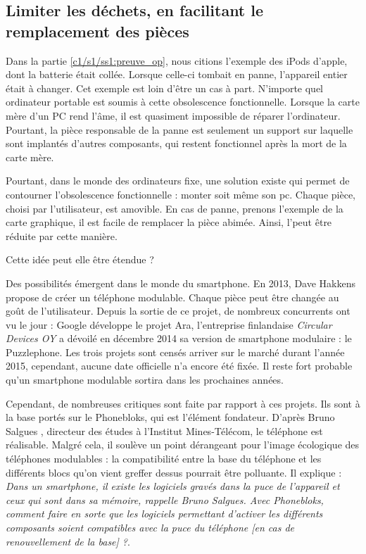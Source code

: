 \subsection{Limiter les déchets, en facilitant le remplacement des pièces }

Dans la partie \ref{c1/s1/ss1:preuve_op}, nous citions l'exemple des iPods d'apple, dont la batterie était collée. Lorsque celle-ci tombait en panne,  l'appareil entier était à changer. 
Cet exemple est loin d'être un cas à part. N'importe quel ordinateur portable est soumis à cette obsolescence fonctionnelle. Lorsque la carte mère d'un PC rend l'âme, il est quasiment impossible de réparer l'ordinateur. Pourtant, la pièce responsable de la panne est seulement un support sur laquelle sont implantés d'autres composants, qui restent fonctionnel après la mort de la carte mère.  

Pourtant, dans le monde des ordinateurs fixe, une solution existe qui permet de contourner l'obsolescence fonctionnelle : monter soit même son pc. Chaque pièce, choisi par l'utilisateur, est amovible. En cas de panne, prenons l'exemple de la carte graphique, il est facile de remplacer la pièce abimée. Ainsi, l'\op peut être réduite par cette manière. 


Cette idée peut elle être étendue ? 

\bigbreak

Des possibilités émergent dans le monde du smartphone. En 2013, Dave Hakkens propose de créer un téléphone modulable. Chaque pièce peut être changée au goût de l'utilisateur. Depuis la sortie de ce projet, de nombreux concurrents ont vu le jour : Google développe le projet Ara,  l'entreprise finlandaise \textit{Circular Devices OY} a dévoilé en décembre 2014 sa version de smartphone modulaire : le Puzzlephone. Les trois projets sont censés arriver sur le marché durant l'année 2015, cependant, aucune date officielle n'a encore été fixée. Il reste fort probable qu'un smartphone modulable sortira dans les prochaines années. 

Cependant, de nombreuses critiques sont faite par rapport à ces projets. Ils sont à la base portés sur le Phonebloks, qui est l'élément fondateur. D'après  Bruno Salgues \cite{phonebloks_critiques} , directeur des études à l'Institut Mines-Télécom, le téléphone est réalisable. Malgré cela, il soulève un point  dérangeant pour l'image écologique des téléphones modulables : la compatibilité entre la base du téléphone et les différents blocs qu'on vient greffer dessus pourrait être polluante. Il explique : \og{}\textit{Dans un smartphone, il existe les logiciels gravés dans la puce de l’appareil et ceux qui sont dans sa mémoire, rappelle Bruno Salgues. Avec Phonebloks, comment faire en sorte que les logiciels permettant d'activer les différents composants soient compatibles avec la puce du téléphone [en cas de renouvellement de la base] ?}\fg{}. 

